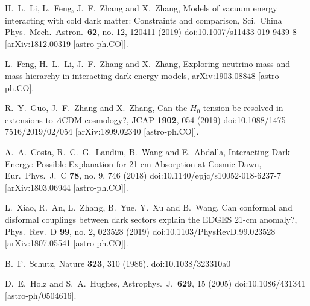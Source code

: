 \documentclass[aps,prd,nofootinbib,amsmath,amssymb,superscriptaddress,twocolumn,10pt]{revtex4}%
\begin{document}
\begin{thebibliography}{99}
  H.~L.~Li, L.~Feng, J.~F.~Zhang and X.~Zhang,
  Models of vacuum energy interacting with cold dark matter: Constraints and comparison,
  Sci.\ China Phys.\ Mech.\ Astron.\  {\bf 62}, no. 12, 120411 (2019)
  doi:10.1007/s11433-019-9439-8
  [arXiv:1812.00319 [astro-ph.CO]].

  L.~Feng, H.~L.~Li, J.~F.~Zhang and X.~Zhang,
  Exploring neutrino mass and mass hierarchy in interacting dark energy models,
  arXiv:1903.08848 [astro-ph.CO].

  R.~Y.~Guo, J.~F.~Zhang and X.~Zhang,
  Can the $H_0$ tension be resolved in extensions to $\Lambda$CDM cosmology?,
  JCAP {\bf 1902}, 054 (2019)
  doi:10.1088/1475-7516/2019/02/054
  [arXiv:1809.02340 [astro-ph.CO]].

  A.~A.~Costa, R.~C.~G.~Landim, B.~Wang and E.~Abdalla,
  Interacting Dark Energy: Possible Explanation for 21-cm Absorption at Cosmic Dawn,
  Eur.\ Phys.\ J.\ C {\bf 78}, no. 9, 746 (2018)
  doi:10.1140/epjc/s10052-018-6237-7
  [arXiv:1803.06944 [astro-ph.CO]].

  L.~Xiao, R.~An, L.~Zhang, B.~Yue, Y.~Xu and B.~Wang,
  Can conformal and disformal couplings between dark sectors explain the EDGES 21-cm anomaly?,
  Phys.\ Rev.\ D {\bf 99}, no. 2, 023528 (2019)
  doi:10.1103/PhysRevD.99.023528
  [arXiv:1807.05541 [astro-ph.CO]].



  B.~F.~Schutz,
  Nature {\bf 323}, 310 (1986).
  doi:10.1038/323310a0

  D.~E.~Holz and S.~A.~Hughes,
  Astrophys.\ J.\  {\bf 629}, 15 (2005)
  doi:10.1086/431341
  [astro-ph/0504616].


\end{thebibliography}
\end{document}
